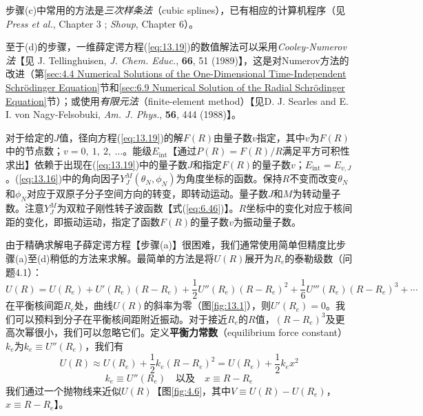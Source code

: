     步骤(c)中常用的方法是\textit{三次样条法}（cubic splines），已有相应的计算机程序（见 \textit{Press et al.}, Chapter 3 ; \textit{Shoup}, Chapter 6）。

    至于(d)的步骤，一维薛定谔方程(\ref{eq:13.19})的数值解法可以采用\textit{Cooley-Numerov法}【见 J. Tellinghuisen, \textit{J. Chem. Educ.}, \textbf{66}, 51 (1989)】，这是对Numerov方法的改进（第\ref{sec:4.4 Numerical Solutions of the One-Dimensional Time-Independent Schrödinger Equation}节和\ref{sec:6.9 Numerical Solution of the Radial Schrödinger Equation}节）；或使用\textit{有限元法}（finite-element method）【见D. J. Searles and E. I. von Nagy-Felsobuki, \textit{Am. J. Phys.}, \textbf{56}, 444 (1988)】。

    对于给定的$J$值，径向方程(\ref{eq:13.19})的解$F\left(R\right)$由量子数$v$指定，其中$v$为$F\left(R\right)$中的节点数；$v = 0,\:1,\:2,\:\ldots$。能级$E_{\text{int}}$【通过$P\left(R\right) = F\left(R\right) / R$满足平方可积性求出】依赖于出现在(\ref{eq:13.19})中的量子数$J$和指定$F\left(R\right)$的量子数$v$；$E_{\text{int}} = E_{v,J}$。(\ref{eq:13.16})中的角向因子$Y_J^M\left(\theta_N,\phi_N\right)$为角度坐标的函数。保持$R$不变而改变$\theta_N$和$\phi_N$对应于双原子分子空间方向的转变，即转动运动。量子数$J$和$M$为转动量子数。注意$Y_J^M$为双粒子刚性转子波函数【式(\ref{eq:6.46})】。$R$坐标中的变化对应于核间距的变化，即振动运动，指定了函数$F\left(R\right)$的量子数$v$为振动量子数。

    由于精确求解电子薛定谔方程【步骤(a)】很困难，我们通常使用简单但精度比步骤(a)至(d)稍低的方法来求解。最简单的方法是将$U\left(R\right)$展开为$R_e$的泰勒级数（问题4.1）：
    \begin{equation}
        U\left(R\right) = U\left(R_e\right) + U'\left(R_e\right) \left(R - R_e\right) + \frac{1}{2}U''\left(R_e\right) \left(R - R_e\right)^2 + \frac{1}{6}U'''\left(R_e\right) \left(R - R_e\right)^3 + \cdots
        \label{eq:13.20}
    \end{equation}
    在平衡核间距$R_e$处，曲线$U\left(R\right)$的斜率为零（图\ref{fig:13.1}），则$U'\left(R_e\right) = 0$。我们可以预料到分子在平衡核间距附近振动。对于接近$R_e$的$R$值，$\left(R-R_e\right)^3$及更高次幂很小，我们可以忽略它们。定义\textbf{平衡力常数}（equilibrium force constant）$k_e$为$k_e \equiv U''\left(R_e\right)$，我们有
    \begin{equation}
        U\left(R\right) \approx U\left(R_e\right) + \frac{1}{2}k_e \left(R - R_e\right)^2 = U\left(R_e\right) + \frac{1}{2}k_ex^2
        \label{eq:13.21}
    \end{equation}
    \begin{equation*}
        k_e \equiv U''\left(R_e\right) \quad \text{以及} \quad x \equiv R - R_e
    \end{equation*}
    我们通过一个抛物线来近似$U\left(R\right)$【图\ref{fig:4.6}，其中$V \equiv U\left(R\right) - U\left(R_e\right)$，$x \equiv R - R_e$】。

